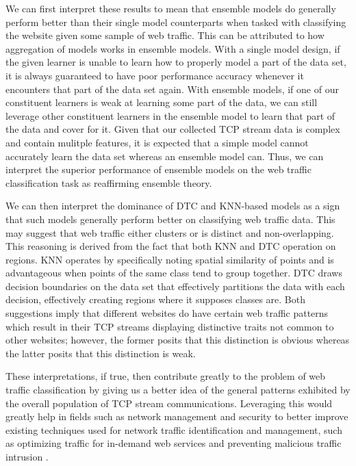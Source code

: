 \documentclass[10pt,sigconf,letterpaper,nonacm]{acmart}
\begin{document}
We can first interpret these results to mean that ensemble models do generally perform better than their single model counterparts when tasked with classifying the website given some sample of web traffic.
This can be attributed to how aggregation of models works in ensemble models.
With a single model design, if the given learner is unable to learn how to properly model a part of the data set, it is always guaranteed to have poor performance accuracy whenever it encounters that part of the data set again.
With ensemble models, if one of our constituent learners is weak at learning some part of the data, we can still leverage other constituent learners in the ensemble model to learn that part of the data and cover for it.
Given that our collected TCP stream data is complex and contain mulitple features, it is expected that a simple model cannot accurately learn the data set whereas an ensemble model can.
Thus, we can interpret the superior performance of ensemble models on the web traffic classification task as reaffirming ensemble theory.

We can then interpret the dominance of DTC and KNN-based models as a sign that such models generally perform better on classifying web traffic data.
This may suggest that web traffic either clusters or is distinct and non-overlapping.
This reasoning is derived from the fact that both KNN and DTC operation on regions.
KNN operates by specifically noting spatial similarity of points and is advantageous when points of the same class tend to group together.
DTC draws decision boundaries on the data set that effectively partitions the data with each decision, effectively creating regions where it supposes classes are.
Both suggestions imply that different websites do have certain web traffic patterns which result in their TCP streams displaying distinctive traits not common to other websites; however, the former posits that this distinction is obvious whereas the latter posits that this distinction is weak.

These interpretations, if true, then contribute greatly to the problem of web traffic classification by giving us a better idea of the general patterns exhibited by the overall population of TCP stream communications.
Leveraging this would greatly help in fields such as network management and security to better improve existing techniques used for network traffic identification and management, such as optimizing traffic for in-demand web services and preventing malicious traffic intrusion \cite{traffic}.
\end{document}
